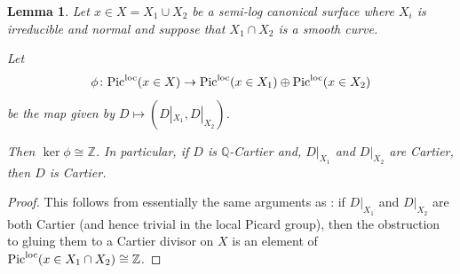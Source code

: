 \documentclass[12pt, a4paper]{amsart}
\newtheorem{lemma}[theorem]{Lemma}
\theoremstyle{definition}
\theoremstyle{named}
\begin{document}
\begin{lemma}
\label{lem_picard_node}
    Let $x \in X = X_1 \cup X_2$ be a semi-log canonical surface where $X_i$ is irreducible and normal and suppose that $X_1 \cap X_2$ is a smooth curve.

Let \begin{align*}\phi\colon {\rm Pic}^{\rm loc}(x \in X)  \rightarrow {\rm Pic}^{\rm loc}(x \in X_1)\oplus {\rm Pic}^{\rm loc}(x \in X_2)\end{align*}
be the map given by $D \mapsto (D|_{X_1}, D|_{X_2})$.

Then $\ker \phi \cong \mathbb Z$.  In particular, if $D$ is $\mathbb Q$-Cartier and, 
$D|_{X_1}$ and $D|_{X_2}$ are Cartier, then $D$ is Cartier.
\end{lemma}
\begin{proof}
This follows from essentially the same arguments as \cite[Example 4.5]{MR3549172}:
 if $D|_{X_1}$ and $D|_{X_2}$
are both Cartier (and hence trivial in the local Picard group), then the obstruction to gluing them to a Cartier divisor on $X$ is an element of ${\rm Pic}^{\rm loc}(x \in X_1 \cap X_2) \cong \mathbb Z$.
\end{proof}
\end{document}

